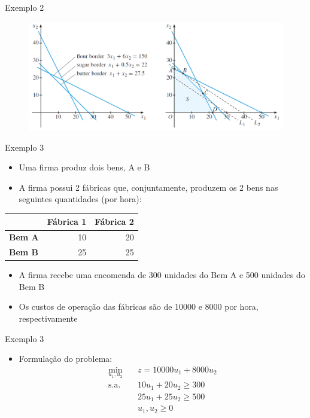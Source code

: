 \documentclass[10pt]{beamer}
\begin{document}
\begin{frame}{Exemplo 2}
    \begin{figure}
        \centering
        \includegraphics[width=\textwidth]{./figures/aula15_fig2.png}        
    \end{figure}
\end{frame}

\begin{frame}{Exemplo 3}
    \begin{itemize}
        \item Uma firma produz dois bens, A e B\bigskip
        \item A firma possui 2 fábricas que, conjuntamente, produzem os 2 bens nas seguintes quantidades (por hora):
    \end{itemize}
    \begin{table}[h]
        \centering
        \begin{tabular}{l|r|r}
        \hline
         & \textbf{Fábrica 1} & \textbf{Fábrica 2} \\
        \hline
        \hline
        \textbf{Bem A} & 10 & 20 \\
        \textbf{Bem B} & 25 & 25 \\
        \hline
        \end{tabular}
    \end{table}
    \begin{itemize}
        \item A firma recebe uma encomenda de 300 unidades do Bem A e 500 unidades do Bem B\bigskip
        \item Os custos de operação das fábricas são de 10000 e 8000 por hora, respectivamente
    \end{itemize}
\end{frame}

\begin{frame}{Exemplo 3}
    \begin{itemize}
        \item Formulação do problema:
        \begin{align*}
            \min_{u_1,u_2} \quad & z = 10000u_1 + 8000u_2\\
            \text{s.a.} \quad & 10u_1 + 20u_2 \geq 300\\
            & 25u_1 + 25u_2 \geq 500\\            
            & u_1, u_2 \geq 0
        \end{align*}
    \end{itemize}
\end{frame}
\end{document}
